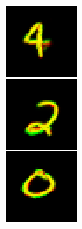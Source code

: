 \begin{figure}
\begin{subfigure}[c]{.09\linewidth}
        \caption{}
    \end{subfigure}
    \hfill
    \begin{subfigure}[c]{.09\linewidth}
        \includegraphics[width=\linewidth]{figures/SCA/mnist/recs}

\end{subfigure}
\end{figure}
